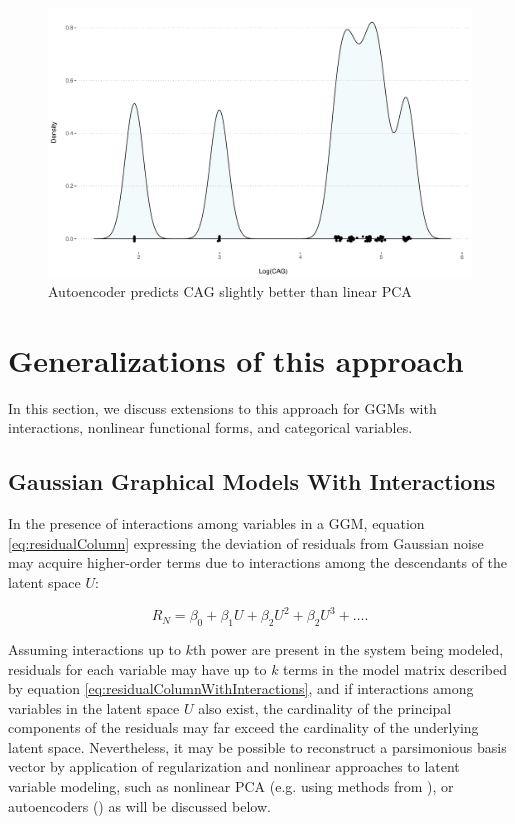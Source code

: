 \documentclass[letterpaper]{article}
\begin{document}
\begin{figure}[ht!]
  \centering
    \includegraphics[width=\linewidth,page=2]{./images/cagPlots.pdf}
    \caption{\label{fig_cag_linear} Autoencoder predicts CAG slightly better than linear PCA}
\end{figure}
\medskip


\section{Generalizations of this approach}
In this section, we discuss extensions to this approach for GGMs with interactions, nonlinear functional forms, and categorical variables. 

\subsection{Gaussian Graphical Models With Interactions}
In the presence of interactions among variables in a GGM, equation \ref{eq:residualColumn} expressing the deviation of residuals from Gaussian noise may acquire higher-order terms due to interactions among the descendants of the latent space $U$:

\begin{equation}
R_N = \beta_0 + \beta_1 U + \beta_2 U^2 + \beta_2 U^3 + \dots.
\label{eq:residualColumnWithInteractions}
\end{equation}

Assuming interactions up to $k$th power are present in the system being modeled, residuals for each variable may have up to $k$ terms in the model matrix described by equation \ref{eq:residualColumnWithInteractions}, and if interactions among variables in the latent space $U$ also exist, the cardinality of the principal components of the residuals may far exceed the cardinality of the underlying latent space.  Nevertheless, it may be possible to reconstruct a parsimonious basis vector by application of regularization and nonlinear approaches to latent variable modeling, such as nonlinear PCA (e.g. using methods from \cite{karatzoglou_kernlab_2004}), or autoencoders (\cite{louizos_causal_2017}) as will be discussed below.
\end{document}
